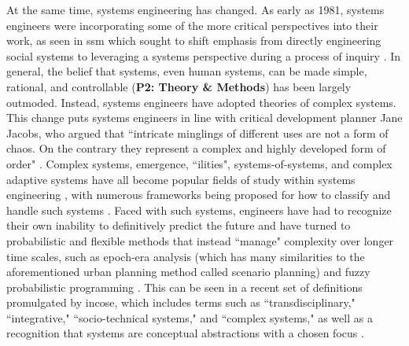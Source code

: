At the same time, systems engineering has changed.  As early as 1981, systems engineers were incorporating some of the more critical perspectives into their work, as seen in \ac{ssm} which sought to shift emphasis from directly engineering social systems to leveraging a systems perspective during a process of inquiry \cite{checklandSystemsThinkingSystems1999}. In general, the belief that systems, even human systems, can be made simple, rational, and controllable (\textbf{P2: Theory \& Methods}) has been largely outmoded. Instead, systems engineers have adopted theories of complex systems. This change puts systems engineers in line with critical development planner Jane Jacobs, who argued that ``intricate minglings of different uses are not a form of chaos. On the contrary they represent a complex and highly developed form of order" \cite[\textsuperscript{(p222)}]{jacobsDeathLifeGreat2016}. Complex systems, emergence, ``ilities", systems-of-systems, and complex adaptive systems have all become popular fields of study within systems engineering \cite{mcdermidComplexityConceptCauses2000, sussmanCollectedViewsComplexity2002, chenComplexityEmergenceEngineering2009, deguetElementsEmergenceIssue2006, officeofthedirectorofsystemsandsoftwareengineeringSystemsEngineeringGuide2008, glassComplexAdaptiveSystems2011, incosecomplexsystemsworkinggroupComplexityPrimerSystems2016, keatingSystemsSystemsEngineering2011, mittalHumanLoopSystem2015, sheardPracticalApplicationsComplexity2005, tolkResearchAgendaSupport2015}, with numerous frameworks being proposed for how to classify and handle such systems \cite{kurtzNewDynamicsStrategy2003, martinFrameworkQuantifyingComplexity2004, sheardComplexityTypologySystems2010, righiCharacterizingComplexitySociotechnical2012, schottlQuantifyingComplexitySocioTechnical2015, reymondetFrameworkSenseMakingComplex2016}. Faced with such systems, engineers have had to recognize their own inability to definitively predict the future and have turned to probabilistic and flexible methods that instead ``manage" complexity over longer time scales, such as epoch-era analysis \cite{rossUsingNaturalValueCentric2008, vascikMethodExploringProgram2015} (which has many similarities to the aforementioned urban planning method called scenario planning) and fuzzy probabilistic programming \cite{zhangRobustStochasticFuzzy2009, liuInexactStochasticFuzzy2015}. This can be seen in a recent set of definitions promulgated by \ac{incose}, which includes terms such as ``transdisciplinary," ``integrative," ``socio-technical systems," and ``complex systems," as well as a recognition that systems are conceptual abstractions with a chosen focus \cite{sillittoSystemsEngineeringSystem2019}. 

